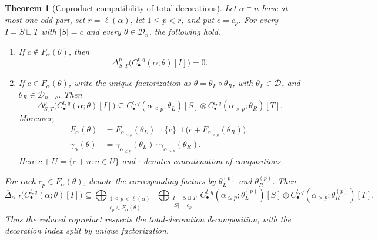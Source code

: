 \documentclass{amsart}
\newtheorem{theorem}{Theorem}[section]
\theoremstyle{definition}
\theoremstyle{remark}
\begin{document}
\begin{theorem}[Coproduct compatibility of total decorations]
\label{thm:total-decoration-cut-coproduct}
Let $\alpha\models n$ have at most one odd part, set $r=\ell(\alpha)$, let
$1\leq p<r$, and put $c=c_p$.  For every $I=S\sqcup T$ with $|S|=c$ and every
$\theta\in\mathcal D_n$, the following hold.
\begin{enumerate}[label=\textup{(\roman*)},leftmargin=*]
\item If $c\notin F_\alpha(\theta)$, then
\[
 \Delta^p_{S,T}\bigl(C_\bullet^{t,q}(\alpha;\theta)[I]\bigr)=0.
\]
\item If $c\in F_\alpha(\theta)$, write the unique factorization as
$\theta=\theta_L\diamond\theta_R$, with
$\theta_L\in\mathcal D_c$ and $\theta_R\in\mathcal D_{n-c}$.  Then
\begin{equation}
 \Delta^p_{S,T}\bigl(C_\bullet^{t,q}(\alpha;\theta)[I]\bigr)
 \subseteq
 C_\bullet^{t,q}(\alpha_{\leq p};\theta_L)[S]\otimes
 C_\bullet^{t,q}(\alpha_{>p};\theta_R)[T].
 \label{eq:total-decoration-coproduct-inclusion}
\end{equation}
Moreover,
\begin{align}
 F_\alpha(\theta)
 &=F_{\alpha_{\leq p}}(\theta_L)
   \sqcup\{c\}
   \sqcup\bigl(c+F_{\alpha_{>p}}(\theta_R)\bigr),
 \label{eq:factorization-cut-locality}\\
 \gamma_\alpha(\theta)
 &=\gamma_{\alpha_{\leq p}}(\theta_L)
   \mathbin{\cdot}
   \gamma_{\alpha_{>p}}(\theta_R).
 \label{eq:ribbon-concatenation-at-cut}
\end{align}
Here $c+U=\{c+u:u\in U\}$ and $\cdot$ denotes concatenation of compositions.
\end{enumerate}
For each $c_p\in F_\alpha(\theta)$, denote the corresponding factors by
$\theta_L^{(p)}$ and $\theta_R^{(p)}$.  Then
\begin{equation}
 \overline\Delta_{\alpha,I}
 \bigl(C_\bullet^{t,q}(\alpha;\theta)[I]\bigr)
 \subseteq
 \bigoplus_{\substack{1\leq p<\ell(\alpha)\\c_p\in F_\alpha(\theta)}}
 \ \bigoplus_{\substack{I=S\sqcup T\\|S|=c_p}}
 C_\bullet^{t,q}(\alpha_{\leq p};\theta_L^{(p)})[S]
 \otimes
 C_\bullet^{t,q}(\alpha_{>p};\theta_R^{(p)})[T].
 \label{eq:total-decoration-coproduct-decomposition}
\end{equation}
Thus the reduced coproduct respects the total-decoration decomposition, with
the decoration index split by unique factorization.
\end{theorem}
\end{document}

